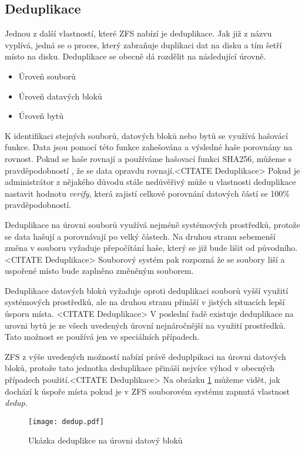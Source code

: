     \subsection{Deduplikace}
    \label{dedup}
    Jednou z další vlastností, které ZFS nabízí je deduplikace. Jak již z názvu vyplívá, jedná se o proces, který zabraňuje duplikaci dat na disku a tím šetří místo na disku. Deduplikace se obecně dá rozdělit na následující úrovně.
    \begin{itemize}
      \item Úroveň souborů
      \item Úroveň datavých bloků 
      \item Úroveň bytů
    \end{itemize}
    
    K identifikaci stejných souborů, datových bloků nebo bytů se využívá hašovácí funkce. Data jsou pomocí této funkce zahešována a výsledné haše porovnány na rovnost. Pokud se haše rovnají a používáme hašovací funkci SHA256, můžeme s pravděpodobností , že se data opravdu rovnají.<CITATE Deduplikace> Pokud je administrátor z nějakého důvodu stále nedůvěřivý může u vlastnosti deduplikace nastavit hodnotu \emph{verify}, která zajistí celkové porovnání datových částí se 100\% pravděpodobností.
    
    Deduplikace na úrovni souborů využívá nejméně systémových prostředků, protože se data hašují a porovnávají po velký částech. Na druhou stranu sebemenší změna v souboru vyžaduje přepočítání haše, který se již bude lišit od původního.<CITATE Deduplikace> Souborový systém pak rozpozná že se soubory liší a uspořené místo bude zaplněno změněným souborem.
    
    Deduplikace datových bloků vyžaduje oproti deduplikaci souborů vyšší využití systémových prostředků, ale na druhou stranu přináší v jistých situacích lepší úsporu místa. <CITATE Deduplikace>      
    V poslední řadě existuje deduplikace na urovni bytů je ze všech uvedených úrovní nejnáročnější na využití prostředků. Tato možnost se používá jen ve speciálních případech.
    
    ZFS z výše uvedených možností nabízí právě deduplpikaci na úrovni datových bloků, protože tato jednotka deduplikace přináší nejvíce výhod v obecných případech použití.<CITATE Deduplikace> Na obrázku \ref{blockdedup} můžeme vidět, jak dochází k úspoře místa pokud je v ZFS souborovém systému zapnutá vlastnost \emph{dedup}.
    \begin{figure}[!h]
        \caption{Ukázka deduplikce na úrovni datový bloků}
        \label{blockdedup}
        \texttt{[image: dedup.pdf]}
    \end{figure}        
